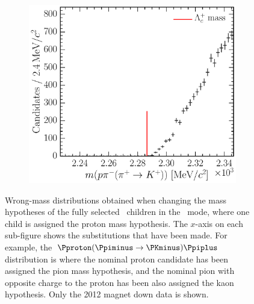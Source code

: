 \begin{figure}
\begin{subfigure}[b]{0.3\textwidth}
    \caption{\decay{\PLambdac}{\Pproton\PKminus\PKplus}}
    \label{fig:cpv:selection:background_study:ppipi_baryon:pkk}
  \end{subfigure}
  \begin{subfigure}[b]{0.3\textwidth}
    \includegraphics[width=\textwidth]{figures/cpv/selection/background_study/ppipi/LcToppipi_2012_MagDown_Lc_pp_pim_pipTokp}
    \caption{\decay{\PLambdac}{\Pproton\Ppiminus\PKplus}}
    \label{fig:cpv:selection:background_study:ppipi_baryon:ppik}
  \end{subfigure}
  \caption{%
    Wrong-mass distributions obtained when changing the mass hypotheses of the
    fully selected \PLambdac\ children in the \ppipi\ mode, where one child is
    assigned the proton mass hypothesis.
    The $x$-axis on each sub-figure shows the substitutions that have been
    made.
    For example, the ${\Pproton(\Ppiminus \to \PKminus)\Ppiplus}$ distribution is where the
    nominal proton candidate has been assigned the pion mass hypothesis, and
    the nominal pion with opposite charge to the proton has been also assigned
    the kaon hypothesis.
    Only the 2012 magnet down data is shown.
  }
  \label{fig:cpv:selection:background_study:ppipi_baryon}
\end{figure}

